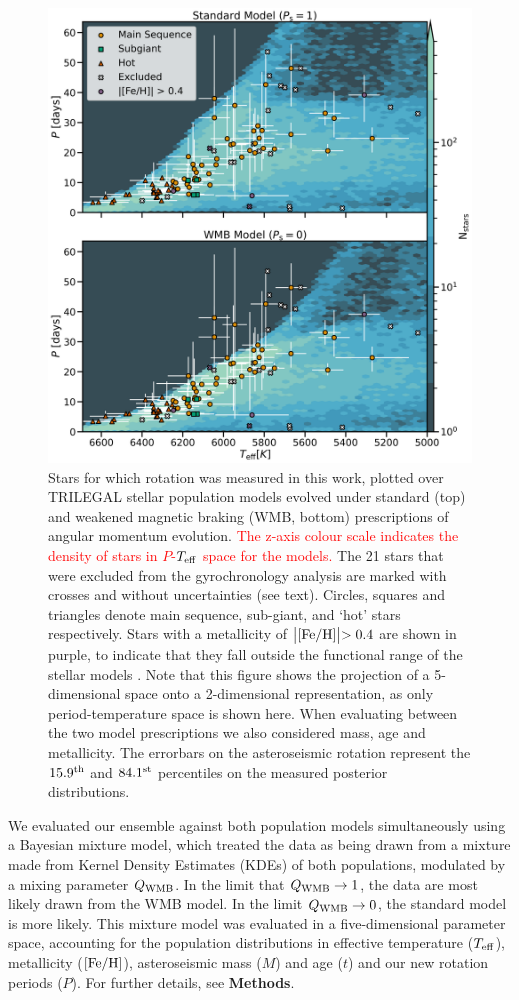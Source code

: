 \documentclass[12pt]{article}
\newcommand{\teff}{\mbox{$T_{\rm eff}$}\xspace}
\newcommand{\feh}{\mbox{$\rm{[Fe/H]}$}\xspace}
\newcommand{\rtwo}[1]{\textcolor{red}{{#1}}}
\begin{document}
\begin{figure}
	\centering
	\includegraphics[width=.9\textwidth]{fullsample.png}
	\caption{Stars for which rotation was measured in this work, plotted over TRILEGAL \cite{girardi+2012} stellar population models evolved under standard (top) and weakened magnetic braking (WMB, bottom) prescriptions of angular momentum evolution. \rtwo{The z-axis colour scale indicates the density of stars in $P$-\teff space for the models.} The 21 stars that were excluded from the gyrochronology analysis are marked with crosses and without uncertainties (see text). Circles, squares and triangles denote main sequence, sub-giant, and `hot' stars respectively. Stars with a metallicity of $\bigl\lvert \feh \bigl\rvert > 0.4$ are shown in purple, to indicate that they fall outside the functional range of the stellar models  \cite{vansaders+2019}. Note that this figure shows the projection of a 5-dimensional space onto a 2-dimensional representation, as only period-temperature space is shown here. When evaluating between the two model prescriptions we also considered mass, age and metallicity. The errorbars on the asteroseismic rotation represent the $15.9^{\rm th}$ and $84.1^{\rm st}$ percentiles on the measured posterior distributions.}
	\label{fig:fullsample}
\end{figure}

We evaluated our ensemble against both population models simultaneously using a Bayesian mixture model, which treated the data as being drawn from a mixture made from Kernel Density Estimates (KDEs) of both populations, modulated by a mixing parameter $Q_{\rm WMB}$. In the limit that $Q_{\rm WMB} \rightarrow 1$, the data are most likely drawn from the WMB model. In the limit $Q_{\rm WMB} \rightarrow 0$, the standard model is more likely. This mixture model was evaluated in a five-dimensional parameter space, accounting for the population distributions in effective temperature ($T_{\rm eff}$), metallicity (\feh), asteroseismic mass ($M$) and age ($t$) and our new rotation periods ($P$). For further details, see \textbf{Methods}.\\
\end{document}
